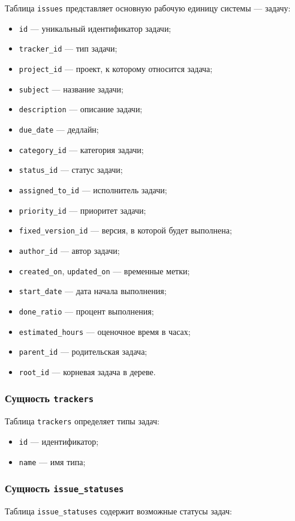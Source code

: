 Таблица \texttt{issues} представляет основную рабочую единицу системы --- задачу:
\begin{itemize}
    \item \texttt{id} --- уникальный идентификатор задачи;
    \item \texttt{tracker\_id} --- тип задачи;
    \item \texttt{project\_id} --- проект, к которому относится задача;
    \item \texttt{subject} --- название задачи;
    \item \texttt{description} --- описание задачи;
    \item \texttt{due\_date} --- дедлайн;
    \item \texttt{category\_id} --- категория задачи;
    \item \texttt{status\_id} --- статус задачи;
    \item \texttt{assigned\_to\_id} --- исполнитель задачи;
    \item \texttt{priority\_id} --- приоритет задачи;
    \item \texttt{fixed\_version\_id} --- версия, в которой будет выполнена;
    \item \texttt{author\_id} --- автор задачи;
    \item \texttt{created\_on}, \texttt{updated\_on} --- временные метки;
    \item \texttt{start\_date} --- дата начала выполнения;
    \item \texttt{done\_ratio} --- процент выполнения;
    \item \texttt{estimated\_hours} --- оценочное время в часах;
    \item \texttt{parent\_id} --- родительская задача;
    \item \texttt{root\_id} --- корневая задача в дереве.
\end{itemize}

\subsubsection{Сущность \texttt{trackers}}
Таблица \texttt{trackers} определяет типы задач:

\begin{itemize}
    \item \texttt{id} --- идентификатор;
    \item \texttt{name} --- имя типа;
\end{itemize}

\subsubsection{Сущность \texttt{issue\_statuses}}
Таблица \texttt{issue\_statuses} содержит возможные статусы задач:

